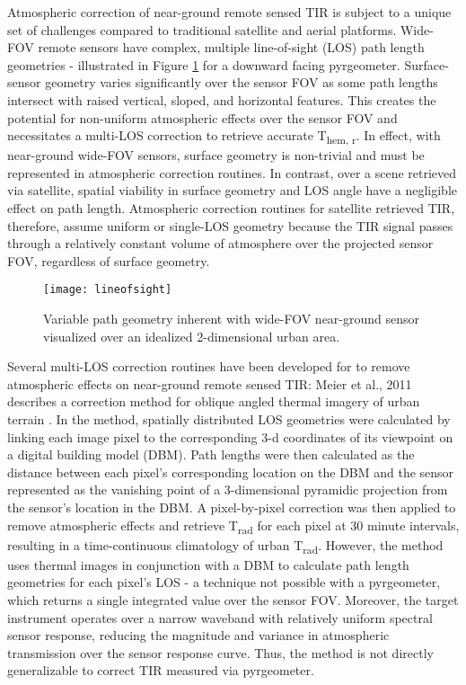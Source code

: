 
Atmospheric correction of near-ground remote sensed TIR is subject to a unique set of challenges compared to traditional satellite and aerial platforms. Wide-FOV remote sensors have complex, multiple line-of-sight (LOS) path length geometries - illustrated in Figure \ref{lineofsight} for a downward facing pyrgeometer. Surface-sensor geometry varies significantly over the sensor FOV as some path lengths intersect with raised vertical, sloped, and horizontal features. This creates the potential for non-uniform atmospheric effects over the sensor FOV and necessitates a multi-LOS correction to retrieve accurate T\textsubscript{hem, r}. In effect, with near-ground wide-FOV sensors, surface geometry is non-trivial and must be represented in atmospheric correction routines. In contrast, over a scene retrieved via satellite, spatial viability in surface geometry and LOS angle have a negligible effect on path length. Atmospheric correction routines for satellite retrieved TIR, therefore, assume uniform or single-LOS geometry because the TIR signal passes through a relatively constant volume of atmosphere over the projected sensor FOV, regardless of surface geometry.

\begin{figure}[H]
	\texttt{[image: lineofsight]}
	\caption{Variable path geometry inherent with wide-FOV near-ground sensor visualized over an idealized 2-dimensional urban area.}
	\label{lineofsight}
\end{figure}

Several multi-LOS correction routines have been developed for to remove atmospheric effects on near-ground remote sensed TIR: Meier et al., 2011 describes a correction method for oblique angled thermal imagery of urban terrain \cite{Meier2011}. In the method, spatially distributed LOS geometries were calculated by linking each image pixel to the corresponding 3-d coordinates of its viewpoint on a digital building model (DBM). Path lengths were then calculated as the distance between each pixel's corresponding location on the DBM and the sensor represented as the vanishing point of a 3-dimensional pyramidic projection from the sensor's location in the DBM. A pixel-by-pixel correction was then applied to remove atmospheric effects and retrieve T\textsubscript{rad} for each pixel at 30 minute intervals, resulting in a time-continuous climatology of urban T\textsubscript{rad}. However, the method uses thermal images in conjunction with a DBM to calculate path length geometries for each pixel's LOS - a technique not possible with a pyrgeometer, which returns a single integrated value over the sensor FOV. Moreover, the target instrument operates over a narrow waveband with relatively uniform spectral sensor response, reducing the magnitude and variance in atmospheric transmission over the sensor response curve. Thus, the method is not directly generalizable to correct TIR measured via pyrgeometer.

